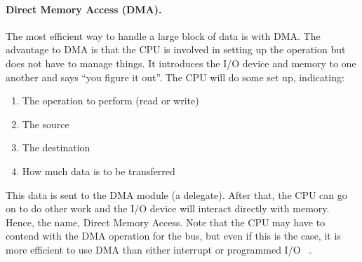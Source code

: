 \paragraph{Direct Memory Access (DMA).} The most efficient way to handle a large block of data is with DMA. The advantage to DMA is that the CPU is involved in setting up the operation but does not have to manage things. It introduces the I/O device and memory to one another and says ``you figure it out''. The CPU will do some set up, indicating:

\begin{enumerate}
	\item The operation to perform (read or write)
	\item The source
	\item The destination
	\item How much data is to be transferred
\end{enumerate}

This data is sent to the DMA module (a delegate). After that, the CPU can go on to do other work and the I/O device will interact directly with memory. Hence, the name, Direct Memory Access. Note that the CPU may have to contend with the DMA operation for the bus, but even if this is the case, it is more efficient to use DMA than either interrupt or programmed I/O ~\cite{osi}.



